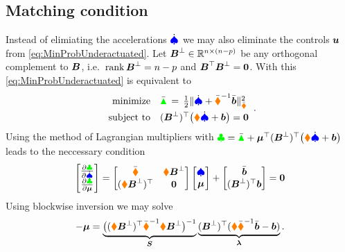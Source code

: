 \subsection{Matching condition}\label{sec:MatchingCondition}
Instead of elimiating the accelerations $\sysVeld$ we may also eliminate the controls $\sysInput$ from \eqref{eq:MinProbUnderactuated}.
Let $\sysInputMatLComp \in \RealNum^{\dimConfigSpace\times(\dimConfigSpace-\numInputs)}$ be any orthogonal complement to $\sysInputMat$, i.e.\ $\rank \sysInputMatLComp = \dimConfigSpace-\numInputs$ and $\sysInputMat^\top \sysInputMatLComp = \mat{0}$.
With this \eqref{eq:MinProbUnderactuated} is equivalent to
\begin{align}\label{eq:MinProbUnderactuatedMatch}
 \begin{array}{rl}
  \text{minimize} & \GaussianConstraintC \, = \, \tfrac{1}{2} \norm[\sysInertiaMatC]{\sysVeld + \sysInertiaMatC^{-1} \sysForceC}^2
  \\[1ex]
  \text{subject to} & (\sysInputMatLComp)^\top \big(\sysInertiaMat \sysVeld + \sysForce\big) = \tuple{0}
 \end{array}
 .
\end{align}
Using the method of Lagrangian multipliers with $\Lagrangian = \GaussianConstraintC + \tuple{\mu}^\top (\sysInputMatLComp)^\top \big(\sysInertiaMat \sysVeld + \sysForce\big)$ 
leads to the neccessary condition
\begin{align}
  \begin{bmatrix} \pdiff[\Lagrangian]{\sysVeld} \\ \pdiff[\Lagrangian]{\tuple{\mu}} \end{bmatrix}
  =
  \begin{bmatrix} \sysInertiaMatC & \sysInertiaMat \sysInputMatLComp \\ (\sysInertiaMat \sysInputMatLComp)^\top & \mat{0} \end{bmatrix}
  \begin{bmatrix} \sysVel \\ \tuple{\mu} \end{bmatrix}
  +
  \begin{bmatrix} \sysForceC \\ (\sysInputMatLComp)^\top\sysForce \end{bmatrix}
  = \tuple{0}
\end{align}
Using blockwise inversion we may solve
\begin{align}\label{eq:DefMatchingForce}
 -\tuple{\mu} = \underbrace{\big( (\sysInertiaMat \sysInputMatLComp)^\top \sysInertiaMatC^{-1} \sysInertiaMat \sysInputMatLComp \big)^{-1}}_{\mat{S}} \underbrace{(\sysInputMatLComp)^\top (\sysInertiaMat \sysInertiaMatC^{-1} \sysForceC - \sysForce)}_{\tuple{\lambda}}.
\end{align}
